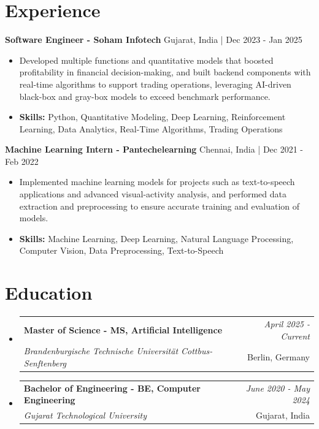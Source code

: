 \documentclass[a4paper,11pt]{article}
\makeatletter
\newcommand{\resumeSubheading}[4]{
\vspace{0.5mm}\item
    \begin{tabular*}{\linewidth}[t]{l@{\extracolsep{\fill}}r}
        \textbf{#1} & \textit{\footnotesize{#4}} \\
        \textit{\footnotesize{#3}} &  \footnotesize{#2}\\
    \end{tabular*}
    \vspace{-2.4mm}
}
\makeatother
\begin{document}
\section{\textbf{Experience}}


\vspace{1mm}
  \textbf{Software Engineer - Soham Infotech} \hfill Gujarat, India | Dec 2023 - Jan 2025
\vspace{-1.5mm} %
\begin{itemize}
  \item Developed multiple functions and quantitative models that boosted profitability in financial decision-making, and built backend components with real-time algorithms to support trading operations, leveraging AI-driven black-box and gray-box models to exceed benchmark performance.

\vspace{-2mm}
  \item \textbf{Skills:} Python, Quantitative Modeling, Deep Learning, Reinforcement Learning, Data Analytics, Real-Time Algorithms, Trading Operations
\end{itemize}

\vspace{1mm}
  \textbf{Machine Learning Intern - Pantechelearning} \hfill Chennai, India | Dec 2021 - Feb 2022
\vspace{-1.5mm} %
\begin{itemize}
  \item Implemented machine learning models for projects such as text-to-speech applications and advanced visual-activity analysis, and performed data extraction and preprocessing to ensure accurate training and evaluation of models.
\vspace{-2mm}
  \item \textbf{Skills:} Machine Learning, Deep Learning, Natural Language Processing, Computer Vision, Data Preprocessing, Text-to-Speech
\end{itemize}\section{\textbf{Education}}
\vspace{-0.4mm}

\begin{itemize}[leftmargin=0.15in, label={}]
\resumeSubheading
{Master of Science - MS, Artificial Intelligence }{Berlin, Germany}
{Brandenburgische Technische Universität Cottbus-Senftenberg  }{April 2025 - Current}

\vspace{1.0mm} %
\resumeSubheading
{Bachelor of Engineering - BE, Computer Engineering  }{Gujarat, India}
{Gujarat Technological University }{June 2020 - May 2024}

\end{itemize}
\end{document}

